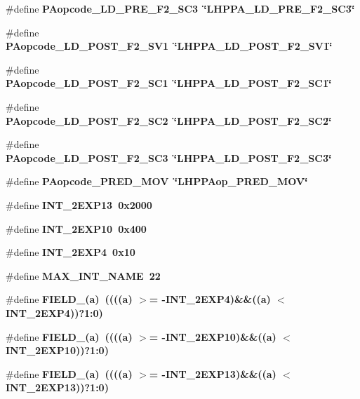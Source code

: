 \begin{CompactItemize}
\item 
\#define \bf{PAopcode\_\-LD\_\-PRE\_\-F2\_\-SC3}~\char`\"{}LHPPA\_\-LD\_\-PRE\_\-F2\_\-SC3\char`\"{}
\item 
\#define \bf{PAopcode\_\-LD\_\-POST\_\-F2\_\-SV1}~\char`\"{}LHPPA\_\-LD\_\-POST\_\-F2\_\-SV1\char`\"{}
\item 
\#define \bf{PAopcode\_\-LD\_\-POST\_\-F2\_\-SC1}~\char`\"{}LHPPA\_\-LD\_\-POST\_\-F2\_\-SC1\char`\"{}
\item 
\#define \bf{PAopcode\_\-LD\_\-POST\_\-F2\_\-SC2}~\char`\"{}LHPPA\_\-LD\_\-POST\_\-F2\_\-SC2\char`\"{}
\item 
\#define \bf{PAopcode\_\-LD\_\-POST\_\-F2\_\-SC3}~\char`\"{}LHPPA\_\-LD\_\-POST\_\-F2\_\-SC3\char`\"{}
\item 
\#define \bf{PAopcode\_\-PRED\_\-MOV}~\char`\"{}LHPPAop\_\-PRED\_\-MOV\char`\"{}
\item 
\#define \bf{INT\_\-2EXP13}~0x2000
\item 
\#define \bf{INT\_\-2EXP10}~0x400
\item 
\#define \bf{INT\_\-2EXP4}~0x10
\item 
\#define \bf{MAX\_\-INT\_\-NAME}~22
\item 
\#define \bf{FIELD\_}(a)~((((a) $>$= -INT\_\-2EXP4)\&\&((a) $<$ INT\_\-2EXP4))?1:0)
\item 
\#define \bf{FIELD\_}(a)~((((a) $>$= -INT\_\-2EXP10)\&\&((a) $<$ INT\_\-2EXP10))?1:0)
\item 
\#define \bf{FIELD\_}(a)~((((a) $>$= -INT\_\-2EXP13)\&\&((a) $<$ INT\_\-2EXP13))?1:0)
\end{CompactItemize}
